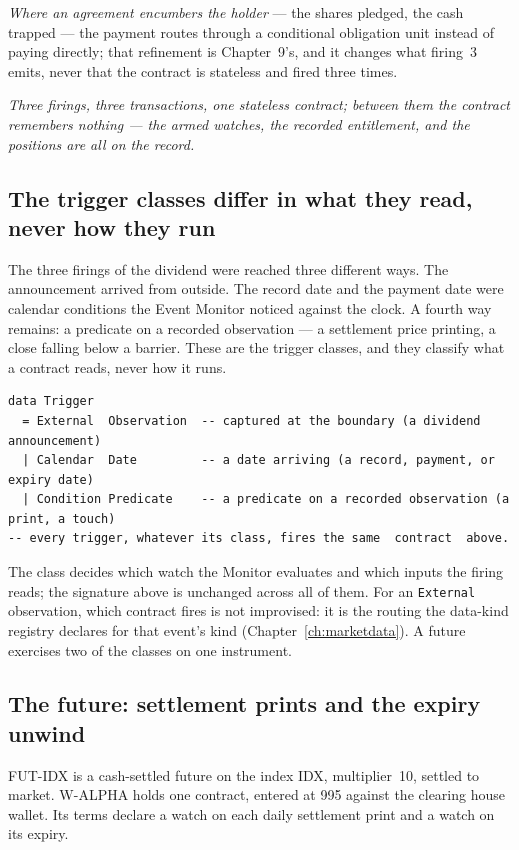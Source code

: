 \documentclass[11pt,a4paper]{article}
\begin{document}
\emph{Where an agreement encumbers the holder} --- the shares pledged, the cash
trapped --- the payment routes through a conditional obligation unit instead of
paying directly; that refinement is Chapter~9's, and it changes what firing~3
emits, never that the contract is stateless and fired three times.

\emph{Three firings, three transactions, one stateless contract; between them
the contract remembers nothing --- the armed watches, the recorded entitlement,
and the positions are all on the record.}

\subsection{The trigger classes differ in what they read, never how they run}

The three firings of the dividend were reached three different ways. The
announcement arrived from outside. The record date and the payment date were
calendar conditions the Event Monitor noticed against the clock. A fourth way
remains: a predicate on a recorded observation --- a settlement price printing,
a close falling below a barrier. These are the trigger classes, and they
classify what a contract reads, never how it runs.

\begin{lstlisting}
data Trigger
  = External  Observation  -- captured at the boundary (a dividend announcement)
  | Calendar  Date         -- a date arriving (a record, payment, or expiry date)
  | Condition Predicate    -- a predicate on a recorded observation (a print, a touch)
-- every trigger, whatever its class, fires the same  contract  above.
\end{lstlisting}

The class decides which watch the Monitor evaluates and which inputs the firing
reads; the signature above is unchanged across all of them. For an \texttt{External}
observation, which contract fires is not improvised: it is the routing the data-kind
registry declares for that event's kind (Chapter~\ref{ch:marketdata}). A future exercises
two of the classes on one instrument.

\subsection{The future: settlement prints and the expiry unwind}

FUT-IDX is a cash-settled future on the index IDX, multiplier~10, settled to
market. W-ALPHA holds one contract, entered at 995 against the clearing house
wallet. Its terms declare a watch on each daily settlement print and a watch on
its expiry.
\end{document}
